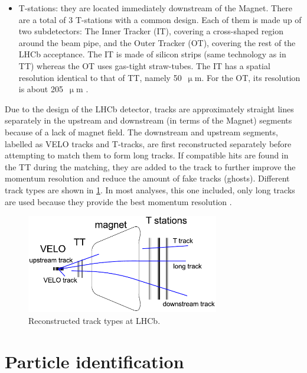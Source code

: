 \begin{itemize}
    \item T-stations:
        they are located immediately downstream of the Magnet.
        There are a total of 3 T-stations with a common design.
        Each of them is made up of two subdetectors: The Inner Tracker (IT),
        covering a cross-shaped region around the beam pipe,
        and the Outer Tracker (OT),
        covering the rest of the LHCb acceptance.
        The IT is made of silicon strips (same technology as in TT) whereas the
        OT uses gas-tight straw-tubes.
        The IT has a spatial resolution identical to that of TT,
        namely 50~$\upmu$m.
        For the OT, its resolution is about 205~$\upmu$m
        \cite{OT_2014}.
\end{itemize}

Due to the design of the LHCb detector, tracks are approximately straight lines
separately in the upstream and downstream (in terms of the Magnet) segments
because of a lack of magnet field.
The downstream and upstream segments,
labelled as VELO tracks and T-tracks,
are first reconstructed separately before attempting to match them to form long
tracks.
If compatible hits are found in the TT during the matching,
they are added to the track to further improve the momentum resolution and
reduce the amount of fake tracks (ghosts).
Different track types are shown in \cref{fig:track-types}.
In most analyses, this one included, only long tracks are used because they
provide the best momentum resolution
\cite{LHCb-DP-2013-002}.

\begin{figure}[!htb]
    \centering
    \includegraphics[width=0.75\textwidth]{./figs-detector/tracking/track_type.pdf}
    \caption{
        Reconstructed track types at LHCb.
    }
    \label{fig:track-types}
\end{figure}


\section{Particle identification}
\label{ref:detector:pid}


